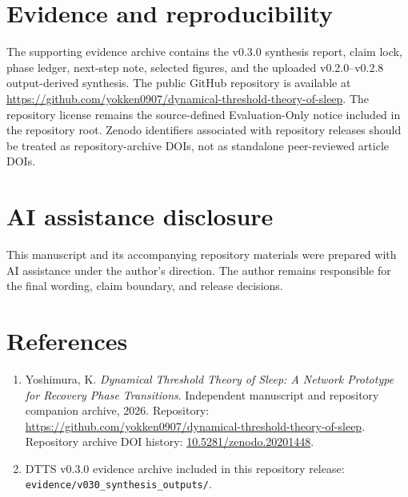 \documentclass[11pt,a4paper]{article}
\begin{document}
\section{Evidence and reproducibility}
The supporting evidence archive contains the v0.3.0 synthesis report, claim lock, phase ledger, next-step note, selected figures, and the uploaded v0.2.0--v0.2.8 output-derived synthesis. The public GitHub repository is available at \url{https://github.com/yokken0907/dynamical-threshold-theory-of-sleep}. The repository license remains the source-defined Evaluation-Only notice included in the repository root. Zenodo identifiers associated with repository releases should be treated as repository-archive DOIs, not as standalone peer-reviewed article DOIs.

\section*{AI assistance disclosure}
This manuscript and its accompanying repository materials were prepared with AI assistance under the author's direction. The author remains responsible for the final wording, claim boundary, and release decisions.

\section*{References}
\begin{enumerate}
\item Yoshimura, K. \textit{Dynamical Threshold Theory of Sleep: A Network Prototype for Recovery Phase Transitions}. Independent manuscript and repository companion archive, 2026. Repository: \url{https://github.com/yokken0907/dynamical-threshold-theory-of-sleep}. Repository archive DOI history: \href{https://doi.org/10.5281/zenodo.20201448}{10.5281/zenodo.20201448}.
\item DTTS v0.3.0 evidence archive included in this repository release: \texttt{evidence/v030\_synthesis\_outputs/}.
\end{enumerate}
\end{document}
